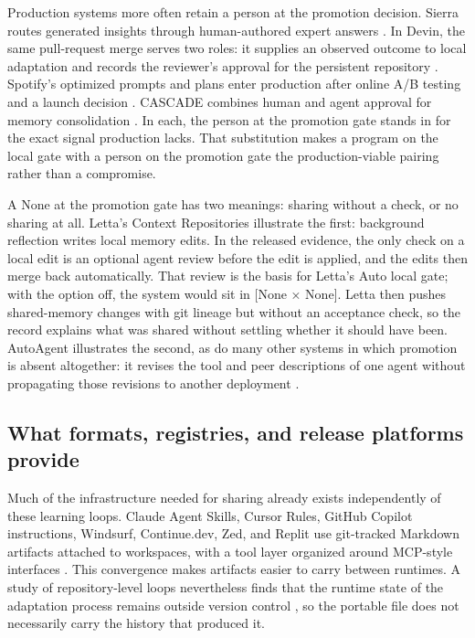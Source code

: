 Production systems more often retain a person at the promotion decision. Sierra routes generated insights through human-authored expert answers \cite{sierra2025os20}. In Devin, the same pull-request merge serves two roles: it supplies an observed outcome to local adaptation and records the reviewer's approval for the persistent repository \cite{cognition2025devinreview}. Spotify's optimized prompts and plans enter production after online A/B testing and a launch decision \cite{palumbo2026spotify}. CASCADE combines human and agent approval for memory consolidation \cite{huang2025cascade}. In each, the person at the promotion gate stands in for the exact signal production lacks. That substitution makes a program on the local gate with a person on the promotion gate the production-viable pairing rather than a compromise.

A None at the promotion gate has two meanings: sharing without a check, or no sharing at all. Letta's Context Repositories illustrate the first: background reflection writes local memory edits. In the released evidence, the only check on a local edit is an optional agent review before the edit is applied, and the edits then merge back automatically. That review is the basis for Letta's Auto local gate; with the option off, the system would sit in {[}None × None{]}. Letta then pushes shared-memory changes with git lineage but without an acceptance check, so the record explains what was shared without settling whether it should have been. AutoAgent illustrates the second, as do many other systems in which promotion is absent altogether: it revises the tool and peer descriptions of one agent without propagating those revisions to another deployment \cite{wang2026autoagent}.

\subsection{What formats, registries, and release platforms provide}\label{what-formats-registries-and-release-platforms-provide}

Much of the infrastructure needed for sharing already exists independently of these learning loops. Claude Agent Skills, Cursor Rules, GitHub Copilot instructions, Windsurf, Continue.dev, Zed, and Replit use git-tracked Markdown artifacts attached to workspaces, with a tool layer organized around MCP-style interfaces \cite{galster2026harnessconfig, barbaste2026harnessengineering}. This convergence makes artifacts easier to carry between runtimes. A study of repository-level loops nevertheless finds that the runtime state of the adaptation process remains outside version control \cite{lulla2026loopengineering}, so the portable file does not necessarily carry the history that produced it.

